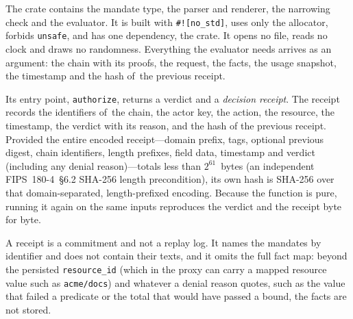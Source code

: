 \documentclass[10pt,twocolumn]{article}
\theoremstyle{plain}
\theoremstyle{definition}
\begin{document}
The crate  contains the mandate type, the parser and renderer, the narrowing check and the evaluator. It is built with \texttt{\#![no\_std]}, uses only the allocator, forbids \texttt{unsafe}, and has one dependency, the  crate. It opens no file, reads no clock and draws no randomness. Everything the evaluator needs arrives as an argument: the chain with its proofs, the request, the facts, the usage snapshot, the timestamp and the hash of~the previous receipt.

Its entry point, \texttt{authorize}, returns a verdict and a \emph{decision receipt}. The receipt records the identifiers of~the chain, the actor key, the action, the resource, the timestamp, the verdict with its reason, and the hash of the previous receipt. Provided the entire encoded receipt---domain prefix, tags, optional previous digest, chain identifiers, length prefixes, field data, timestamp and verdict (including any denial reason)---totals less than $2^{61}$~bytes (an independent FIPS~180-4~\S6.2 SHA-256 length precondition), its own hash is SHA-256 over that domain-separated, length-prefixed encoding. Because the function is pure, running it again on the same inputs reproduces the verdict and the receipt byte for byte.

A receipt is a commitment and not a replay log. It names the mandates by identifier and does not contain their texts, and it omits the full fact map: beyond the persisted \texttt{resource\_id} (which in the proxy can carry a mapped resource value such as \texttt{acme/docs}) and whatever a denial reason quotes, such as the value that failed a predicate or the total that would have passed a bound, the facts are not stored.
\end{document}
